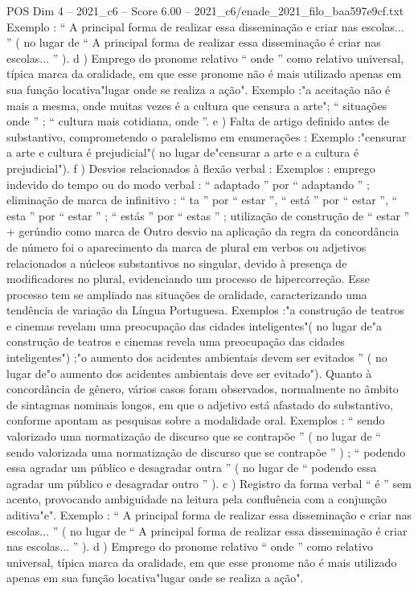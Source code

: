 \begin{textsample}{POS Dim 4 – 2021\_c6 – Score 6.00 – 2021\_c6/enade\_2021\_filo\_baa597e9cf.txt}
Exemplo : “ A principal forma de realizar essa disseminação e criar nas escolas... ” ( no lugar de “ A principal forma de realizar essa disseminação é criar nas escolas... ” ). d ) Emprego do pronome relativo “ onde ” como relativo universal, típica marca da oralidade, em que esse pronome não é mais utilizado apenas em sua função locativa"lugar onde se realiza a ação".
Exemplo :"a aceitação não é mais a mesma, onde muitas vezes é a cultura que censura a arte"; “ situações onde ” ; “ cultura mais cotidiana, onde ”. e ) Falta de artigo definido antes de substantivo, comprometendo o paralelismo em enumerações : Exemplo :"censurar a arte e cultura é prejudicial"( no lugar de"censurar a arte e a cultura é prejudicial"). f ) Desvios relacionados à flexão verbal : Exemplos : emprego indevido do tempo ou do modo verbal : “ adaptado ” por “ adaptando ” ; eliminação de marca de infinitivo : “ ta ” por “ estar ”, “ está ” por “ estar ”, “ esta ” por “ estar ” ; “ estás ” por “ estas ” ; utilização de construção de “ estar ” + gerúndio como marca de Outro desvio na aplicação da regra da concordância de número foi o aparecimento da marca de plural em verbos ou adjetivos relacionados a núcleos substantivos no singular, devido à presença de modificadores no plural, evidenciando um processo de hipercorreção.
Esse processo tem se ampliado nas situações de oralidade, caracterizando uma tendência de variação da Língua Portuguesa.
Exemplos :"a construção de teatros e cinemas revelam uma preocupação das cidades inteligentes"( no lugar de"a construção de teatros e cinemas revela uma preocupação das cidades inteligentes") ;"o aumento dos acidentes ambientais devem ser evitados ” ( no lugar de"o aumento dos acidentes ambientais deve ser evitado").
Quanto à concordância de gênero, vários casos foram observados, normalmente no âmbito de sintagmas nominais longos, em que o adjetivo está afastado do substantivo, conforme apontam as pesquisas sobre a modalidade oral.
Exemplos : “ sendo valorizado uma normatização de discurso que se contrapõe ” ( no lugar de “ sendo valorizada uma normatização de discurso que se contrapõe ” ) ; “ podendo essa agradar um público e desagradar outra ” ( no lugar de “ podendo essa agradar um público e desagradar outro ” ). c ) Registro da forma verbal “ é ” sem acento, provocando ambiguidade na leitura pela confluência com a conjunção aditiva"e".
Exemplo : “ A principal forma de realizar essa disseminação e criar nas escolas... ” ( no lugar de “ A principal forma de realizar essa disseminação é criar nas escolas... ” ). d ) Emprego do pronome relativo “ onde ” como relativo universal, típica marca da oralidade, em que esse pronome não é mais utilizado apenas em sua função locativa"lugar onde se realiza a ação".

\end{textsample}
